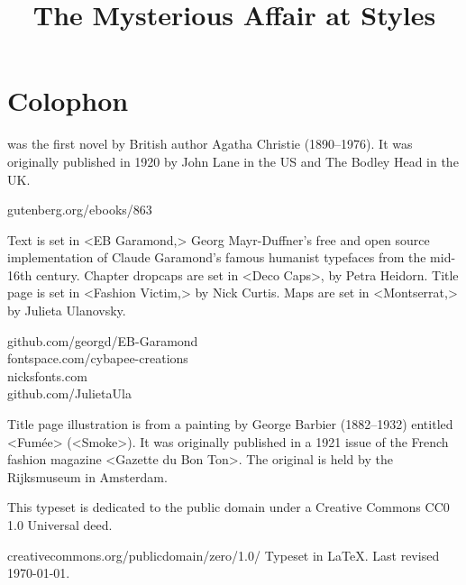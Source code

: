 \documentclass[
paper=5.5in:8.5in,
]{scrbook} %
\title{The Mysterious Affair at Styles}
\begin{document}
\frontmatter

\pagestyle{plain}
\tableofcontents
\clearpage


\mainmatter
\pagestyle{headings}
\renewcommand*{\chapterpagestyle}{plain}
















\clearpage
{}
\chapter*{Colophon}


\centering
\begin{minipage}{\textwidth}
 was the first novel by British author Agatha Christie (1890--1976). It was originally published in 1920 by John Lane in the US and The Bodley Head in the UK.
\end{minipage}
\vfill
gutenberg.org/ebooks/863
\vfill
\divider
\vfill
\begin{minipage}{\textwidth}
Text is set in <EB Garamond,> Georg Mayr-Duffner's free and open source implementation of Claude Garamond’s famous humanist typefaces from the mid-16th century.  Chapter dropcaps are set in <Deco Caps>, by Petra Heidorn. Title page is set in <Fashion Victim,> by Nick Curtis. Maps are set in <Montserrat,> by Julieta Ulanovsky.
\end{minipage}
\vfill
 github.com/georgd/EB-Garamond\\fontspace.com/cybapee-creations\\nicksfonts.com\\github.com/JulietaUla
 \vfill
\divider
\vfill
\begin{minipage}{\textwidth}
Title page illustration is from a painting by George Barbier (1882--1932) entitled <Fumée> (<Smoke>). It was originally published in a 1921 issue of the French fashion magazine <Gazette du Bon Ton>. The original is held by the Rijksmuseum in Amsterdam.
\end{minipage}
\vfill
\divider
\vfill
\begin{minipage}{\textwidth}
This typeset is dedicated to the public domain under a Creative Commons CC0 1.0 Universal deed. 
\end{minipage}
\vfill
creativecommons.org/publicdomain/zero/1.0/
\vfill
\divider
\vfill
Typeset in \LaTeX{}. Last revised \today.
\thispagestyle{empty}
\end{document}
